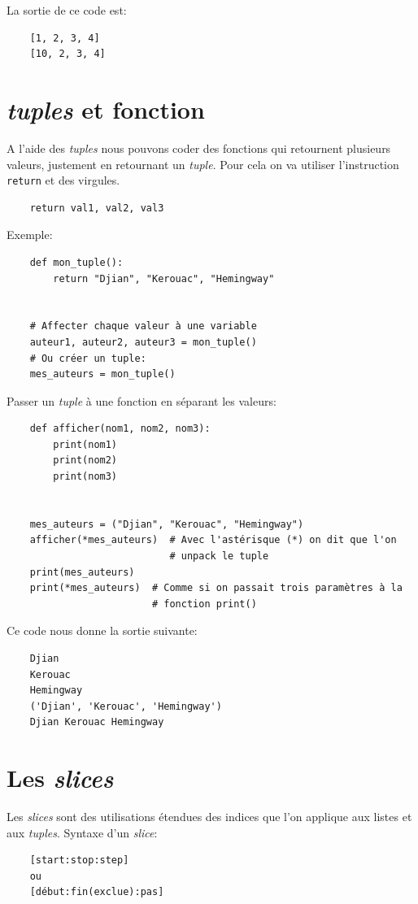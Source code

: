 \documentclass[a4paper,12pt]{book}
\begin{document}
La sortie de ce code est:
\begin{verbatim}
    [1, 2, 3, 4]
    [10, 2, 3, 4]
\end{verbatim}
\medskip

\section{\textit{tuples} et fonction}
A l'aide des \textit{tuples} nous pouvons coder des fonctions qui retournent plusieurs valeurs, justement en retournant un \textit{tuple}. Pour cela on va utiliser l'instruction \texttt{return} et des virgules.
\begin{verbatim}
    return val1, val2, val3
\end{verbatim}
\medskip

Exemple:
\begin{lstlisting}
    def mon_tuple():
        return "Djian", "Kerouac", "Hemingway"
    
    
    # Affecter chaque valeur à une variable
    auteur1, auteur2, auteur3 = mon_tuple()
    # Ou créer un tuple:
    mes_auteurs = mon_tuple()
\end{lstlisting}
\medskip

Passer un \textit{tuple} à une fonction en séparant les valeurs:
\begin{lstlisting}
    def afficher(nom1, nom2, nom3):
        print(nom1)
        print(nom2)
        print(nom3)
    
    
    mes_auteurs = ("Djian", "Kerouac", "Hemingway")
    afficher(*mes_auteurs)  # Avec l'astérisque (*) on dit que l'on 
                            # unpack le tuple
    print(mes_auteurs)
    print(*mes_auteurs)  # Comme si on passait trois paramètres à la 
                         # fonction print()
\end{lstlisting}
\medskip

Ce code nous donne la sortie suivante:
\begin{verbatim}
    Djian
    Kerouac 
    Hemingway
    ('Djian', 'Kerouac', 'Hemingway')
    Djian Kerouac Hemingway
\end{verbatim}
\medskip

\section{Les \textit{slices}}
Les \textit{slices} sont des utilisations étendues des indices que l'on applique aux listes et aux \textit{tuples}. Syntaxe d'un \textit{slice}:
\begin{verbatim}
    [start:stop:step]
    ou
    [début:fin(exclue):pas]
\end{verbatim}
\medskip
\end{document}
